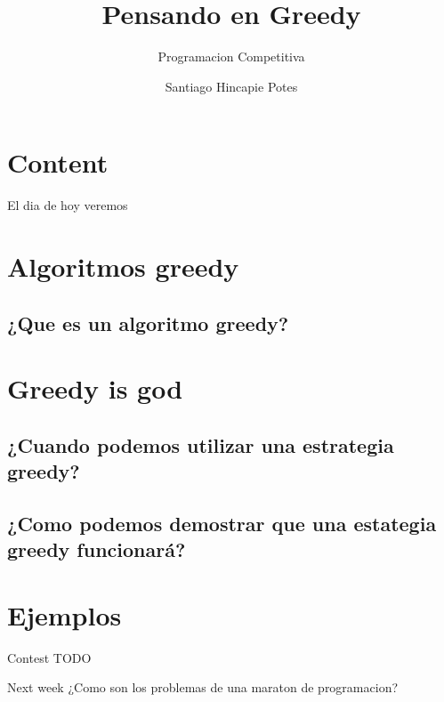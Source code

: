 \documentclass{beamer}
\title{Pensando en Greedy}
\subtitle{Programacion Competitiva}
\author{Santiago Hincapie Potes}
\institute{Universidad EAFIT}
\date{\displaydate{date}}
\begin{document}
\maketitle

\section*{Content}
\begin{frame}{El dia de hoy veremos}
  \tableofcontents[hideallsubsections]
\end{frame}

\section{Algoritmos greedy}
\subsection{¿Que es un algoritmo greedy?}

\section{Greedy is god}
\subsection{¿Cuando podemos utilizar una estrategia greedy?}
\subsection{¿Como podemos demostrar que una estategia greedy funcionará?}

\section{Ejemplos}

\begin{frame}{Contest}
  TODO
\end{frame}

\begin{frame}{Next week}
  \centering 
  \Large
  ¿Como son los problemas de una maraton de programacion?
\end{frame}
\end{document}
